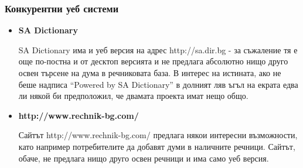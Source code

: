 \subsubsection{Конкурентни уеб системи}

\begin{itemize}
  \item \textbf{SA Dictionary}

    SA Dictionary има и уеб версия на адрес http://sa.dir.bg - за
    съжаление тя е още по-постна и от десктоп версията и не предлага
    абсолютно нищо друго освен търсене на дума в речниковата база. В
    интерес на истината, ако не беше надписа "`Powered by SA
    Dictionary"' в долният ляв ъгъл на екрата едва ли някой би
    предположил, че двамата проекта имат нещо общо.

  \item \textbf{http://www.rechnik-bg.com/}

    Сайтът http://www.rechnik-bg.com/ предлага някои интересни
    възможности, като например потребителите да добавят думи в
    наличните речници. Сайтът, обаче, не предлага нищо друго освен
    речници и има само уеб версия.
\end{itemize}



